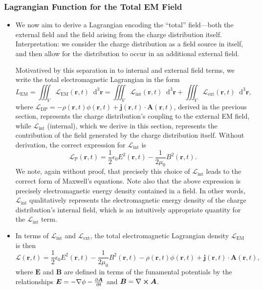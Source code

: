 \documentclass[11pt, a4paper]{article}
\newcommand{\diff}{\mathop{}\!\mathrm{d}} %
\newcommand{\dr}{\diff^{3} \r}  %
\renewcommand{\L}{\mathcal{L}}  %
\renewcommand{\vec}[1]{\bm{#1}} %
\renewcommand{\r}{\vec{r}}
\newcommand{\E}{\vec{E}} %
\newcommand{\B}{\vec{B}} %
\newcommand{\A}{\vec{A}} %
\newcommand{\ee}{\epsilon_{0}}  %
\newcommand{\mm}{\mu_{0}}  %
\renewcommand{\j}{\vec{j}}  %
\renewcommand{\curl}{\nabla \cross}
\renewcommand{\grad}{\nabla}
\begin{document}
\subsubsection{Lagrangian Function for the Total EM Field}
\begin{itemize}
	\item We now aim to derive a Lagrangian encoding the ``total'' field---both the external field and the field arising from the charge distribution itself. Interpretation: we consider the charge distribution as a field source in itself, and then allow for the distribution to occur in an additional external field.
	
	Motivatived by this separation in to internal and external field terms, we write the total electromagnetic Lagrangian in the form
	\begin{equation*}
		L_{\text{EM}} = \iiint_{V} \L_{\text{EM}}(\r, t) \dr = \iiint_{V} \L_{\text{int}}(\r, t) \dr + \iiint_{V} \L_{\text{ext}}(\r, t)\dr,
	\end{equation*}
    where $ \L_{\text{DP}} = - \rho(\r, t) \phi(\r, t) + \j(\r, t)\cdot \A(\r, t) $, derived in the previous section, represents the charge distribution's coupling to the external EM field, while $ \L_{\text{int}} $ (internal), which we derive in this section, represents the contribution of the field generated by the charge distribution itself. Without derivation, the correct expression for $ \L_{\text{int}} $ is
	\begin{equation*}
		\L_{\text{P}}(\r, t) = \frac{1}{2}\ee E^{2}(\r, t) - \frac{1}{2\mm}B^{2}(\r, t).
	\end{equation*}
	We note, again without proof, that precisely this choice of $ \L_{\text{int}} $ leads to the correct form of Maxwell's equations. Note also that the above expression is precisely electromagnetic energy density contained in a field. In other words, $ \L_{\text{int}} $ qualitatively represents the electromagnetic energy density of the charge distribution's internal field, which is an intuitively appropriate quantity for the $ \L_{\text{int}} $ term.
	
	\item In terms of $ \L_{\text{int}} $ and $ \L_{\text{ext}} $, the total electromagnetic Lagrangian density $ \L_{\text{EM}} $ is then
	\begin{equation*}
		\L(\r, t) = \frac{1}{2}\ee E^{2}(\r, t) - \frac{1}{2\mm}B^{2}(\r, t) - \rho(\r, t)\phi(\r, t) + \j(\r, t) \cdot \A(\r, t),
	\end{equation*}
	where $ \E $ and $ \B $ are defined in terms of the funamental potentials by the relationships $ \E = - \grad \phi - \pdv{\A}{t} $ and $ \B = \curl \A $.
\end{itemize}
\end{document}
